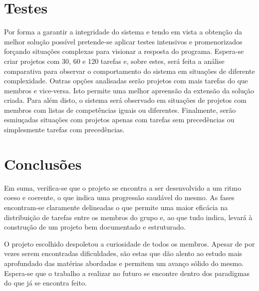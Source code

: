 \begin{titlepage}
\section{Testes}
\justify\normalsize
Por forma a garantir a integridade do sistema e tendo em vista a obtenção da melhor solução possível pretende-se aplicar testes intensivos e promenorizados forçando situações complexas para visionar a resposta do programa. Espera-se criar projetos com 30, 60 e 120 tarefas e, sobre estes, será feita a análise comparativa para observar o comportamento do sistema em situações de diferente complexidade. Outras opções analisadas serão projetos com mais tarefas do que membros e vice-versa. Isto permite uma melhor apreensão da extensão da solução criada. Para além disto, o sistema será observado em situações de projetos com membros com listas de competências iguais ou diferentes. Finalmente, serão esmiuçadas situações com projetos apenas com tarefas sem precedências ou simplesmente tarefas com precedências.


\section{Conclusões}
\justify\normalsize
Em suma, verifica-se que o projeto se encontra a ser desenvolvido a um ritmo coeso e coerente, o que indica uma progressão saudável do mesmo. As fases encontram-se claramente delineadas o que permite uma maior eficácia na distribuição de tarefas entre os membros do grupo e, ao que tudo indica, levará à construção de um projeto bem documentado e estruturado.

O projeto escolhido despoletou a curiosidade de todos os membros. Apesar de por vezes serem encontradas dificuldades, são estas que dão alento ao estudo mais aprofundado das matérias abordadas e permitem um avanço sólido do mesmo. Espera-se que o trabalho a realizar no futuro se encontre dentro dos paradigmas do que já se encontra feito.




\end{titlepage}

